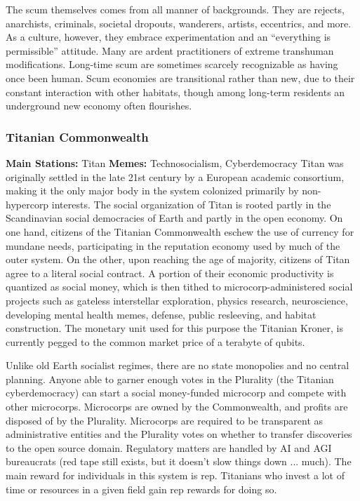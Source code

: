 The scum themselves comes from all manner of 
backgrounds. They are rejects, anarchists, criminals, 
societal dropouts, wanderers, artists, eccentrics, 
and more. As a culture, however, they embrace experimentation
and an ``everything is permissible''
attitude. Many are ardent practitioners of extreme 
transhuman modifications. Long-time scum are 
sometimes scarcely recognizable as having once been 
human. Scum economies are transitional rather than 
new, due to their constant interaction with other 
habitats, though among long-term residents an underground
new economy often flourishes.

\subsubsection{Titanian Commonwealth}

\textbf{Main Stations:} Titan
\textbf{Memes:} Technosocialism, Cyberdemocracy
Titan was originally settled in the late 21st century 
by a European academic consortium, making it the 
only major body in the system colonized primarily
by non-hypercorp interests. The social organization
of Titan is rooted partly in the Scandinavian
social democracies of Earth and partly in the open 
economy. On one hand, citizens of the Titanian Commonwealth
eschew the use of currency for mundane
needs, participating in the reputation economy used 
by much of the outer system. On the other, upon 
reaching the age of majority, citizens of Titan agree 
to a literal social contract. A portion of their economic
productivity is quantized as social money,
which is then tithed to microcorp-administered social 
projects such as gateless interstellar exploration, 
physics research, neuroscience, developing mental 
health memes, defense, public resleeving, and habitat 
construction. The monetary unit used for this purpose
the Titanian Kroner, is currently pegged to the
common market price of a terabyte of qubits.

Unlike old Earth socialist regimes, there are no state 
monopolies and no central planning. Anyone able to 
garner enough votes in the Plurality (the Titanian 
cyberdemocracy) can start a social money-funded 
microcorp and compete with other microcorps. 
Microcorps are owned by the Commonwealth, and 
profits are disposed of by the Plurality. Microcorps 
are required to be transparent as administrative entities
and the Plurality votes on whether to transfer
discoveries to the open source domain. Regulatory 
matters are handled by AI and AGI bureaucrats (red 
tape still exists, but it doesn't slow things down ...
much). The main reward for individuals in this system 
is rep. Titanians who invest a lot of time or resources 
in a given field gain rep rewards for doing so.

